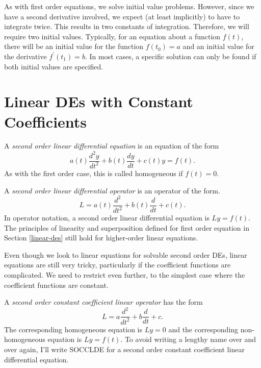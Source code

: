 \documentclass[fleqn,letterpaper]{report}
\begin{document}
As with first order equations, we solve initial value
problems. However, since we have a second derivative involved,
we expect (at least implicitly) to have to integrate twice.
This results in two constants of integration. Therefore, we
will require two initial values. Typically, for an equation
about a function $f(t)$, there will be an initial value for
the function $f(t_0) = a$ and an initial value for the
derivative $f^\prime(t_1) = b$.  In most cases, a specific
solution can only be found if both initial values are
specified.

\section{Linear DEs with Constant Coefficients}
\label{constant-coefficients}

\begin{defn}
A \emph{second order linear differential equation} is an
equation of the form
\begin{equation*}
a(t) \frac{d^2y}{dt^2} + b(t) \frac{dy}{dt} + c(t) y = f(t).
\end{equation*}
As with the first order case, this is called homogeneous if
$f(t) = 0$. 
\end{defn}

\begin{defn}
A \emph{second order linear differential operator} 
is an operator of the form. 
\begin{equation*}
L = a(t) \frac{d^2}{dt^2} + b(t) \frac{d}{dt} + c(t).
\end{equation*}
In operator notation, a second order linear differential
equation is $Ly = f(t)$. The principles of linearity and
superposition defined for first order equation in Section
\ref{linear-des} still hold for higher-order linear equations.
\end{defn}

Even though we look to linear equations for solvable second
order DEs, linear equations are still very tricky, particularly if the
coefficient functions are complicated. We need to restrict
even further, to the simplest case where the coefficient
functions are constant. 

\begin{defn}
A \emph{second order constant coefficient linear operator} has
the form
\begin{equation*}
L = a \frac{d^2}{dt^2} + b \frac{d}{dt} + c.
\end{equation*}
The corresponding homogeneous equation is $Ly=0$ and
the corresponding non-homogeneous equation is $Ly=f(t)$. 
To avoid writing a lengthy name over and over again, I'll
write SOCCLDE for a second order constant coefficient linear
differential equation.
\end{defn}
\end{document}
